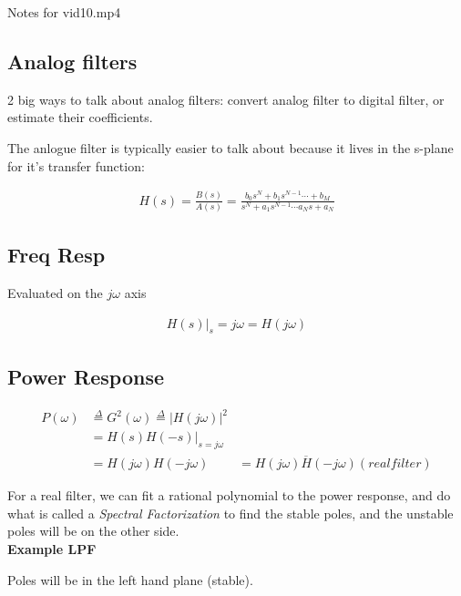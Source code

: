 Notes for vid10.mp4

\subsection*{Analog filters}

2 big ways to talk about analog filters: convert analog filter to
digital filter, or estimate their coefficients. 

The anlogue filter is typically easier to talk about because it lives
in the s-plane for it's transfer function:

\begin{align*}
    H(s) = \frac{B(s)}{A(s)} = 
    \frac{
        b_0 s^N + b_1 s^{N-1} \cdots + b_M
    } {
        s^N + a_1 s^{N-1} \cdots a_N s + a_N
    }
\end{align*}

\subsection*{Freq Resp}

Evaluated on the $j\omega$ axis

\begin{align*}
    H(s) \vert_s=j\omega = H(j\omega)
\end{align*}

\subsection*{Power Response}

\begin{align*}
    P(\omega) 
    &\stackrel{\Delta}{=} G^2(\omega) 
    \stackrel{\Delta}{=}
    \vert H(j \omega) \vert^2 \\
    &= H(s)H(-s)\vert_{s=j\omega} \\
    &= H(j \omega)H(-j\omega) 
    &= \overline{H(j \omega)H(-j\omega)} (real filter)
\end{align*}

For a real filter, we can fit a rational polynomial to the power response, 
and do what is called a \textit{Spectral Factorization} to find the
stable poles, and the unstable poles will be on the other side.\\

\textbf{Example LPF}\\


Poles will be in the left hand plane (stable). 

